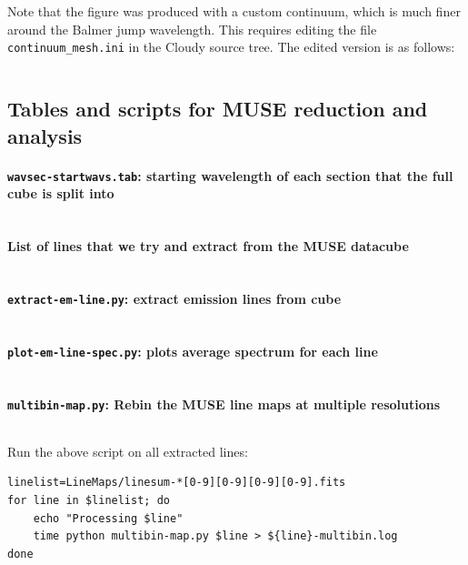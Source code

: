\documentclass[preprint]{aastex}
\newcommand\TsqDir{/Users/will/Work/RubinWFC3/Tsquared}
\begin{document}
\inputminted[fontsize=\footnotesize]{text}{\TsqDir/OrionStars/trap.in}

Note that the figure was produced with a custom continuum, which is
much finer around the Balmer jump wavelength.  This requires editing
the file \verb|continuum_mesh.ini| in the Cloudy source tree.  The
edited version is as follows:

\inputminted[fontsize=\footnotesize]{C}{/Users/will/Work/CLOUDY/git-svn/data/continuum_mesh_balmer_jump.ini}

\subsection{Tables and scripts for MUSE reduction and analysis}
\label{sec:MUSE-tabs-scripts}

\paragraph{\texttt{wavsec-startwavs.tab}: starting wavelength of each
  section that the full cube is split into}
\inputminted[fontsize=\footnotesize,obeytabs,tabsize=12]{text}{wavsec-startwavs.tab}

\paragraph{List of lines that we try and extract from the MUSE datacube}
\inputminted[fontsize=\footnotesize,obeytabs,tabsize=12]{text}{basic-line-list.tab}

\paragraph{\texttt{extract-em-line.py}: extract emission lines from cube}
\inputminted[fontsize=\footnotesize]{python}{extract-em-line.py}

\paragraph{\texttt{plot-em-line-spec.py}: plots average spectrum for
  each line}
\inputminted[fontsize=\footnotesize]{python}{plot-em-line-spec.py}

\paragraph{\texttt{multibin-map.py}: Rebin the MUSE line maps at
  multiple resolutions}

\inputminted[fontsize=\footnotesize]{python}{multibin-map.py}

Run the above script on all extracted lines:
\begin{verbatim}
linelist=LineMaps/linesum-*[0-9][0-9][0-9][0-9].fits
for line in $linelist; do
    echo "Processing $line"
    time python multibin-map.py $line > ${line}-multibin.log
done
\end{verbatim}
\end{document}
